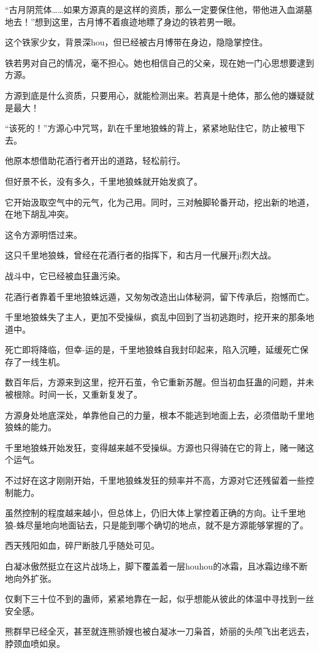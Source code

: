 \begin{this_body}
“古月阴荒体……如果方源真的是这样的资质，那么一定要保住他，带他进入血湖墓地去！”想到这里，古月博不着痕迹地瞟了身边的铁若男一眼。

这个铁家少女，背景深hou，但已经被古月博带在身边，隐隐掌控住。

铁若男对自己的情况，毫不担心。她也相信自己的父亲，现在她一门心思想要逮到方源。

方源到底是什么资质，只要用心，就能检测出来。若真是十绝体，那么他的嫌疑就是最大！

“该死的！”方源心中咒骂，趴在千里地狼蛛的背上，紧紧地贴住它，防止被甩下去。

他原本想借助花酒行者开出的道路，轻松前行。

但好景不长，没有多久，千里地狼蛛就开始发疯了。

它开始汲取空气中的元气，化为己用。同时，三对触脚轮番开动，挖出新的地道，在地下胡乱冲突。

这令方源明悟过来。

这只千里地狼蛛，曾经在花酒行者的指挥下，和古月一代展开ji烈大战。

战斗中，它已经被血狂蛊污染。

花酒行者靠着千里地狼蛛远遁，又匆匆改造出山体秘洞，留下传承后，抱憾而亡。

千里地狼蛛失了主人，更加不受操纵，疯乱中回到了当初逃跑时，挖开来的那条地道中。

死亡即将降临，但幸-运的是，千里地狼蛛自我封印起来，陷入沉睡，延缓死亡保存了一线生机。

数百年后，方源来到这里，挖开石茧，令它重新苏醒。但当初血狂蛊的问题，并未被根除。时间一长，又重新复发了。

方源身处地底深处，单靠他自己的力量，根本不能逃到地面上去，必须借助千里地狼蛛的能力。

千里地狼蛛开始发狂，变得越来越不受操纵。方源也只得骑在它的背上，赌一赌这个运气。

不过好在这才刚刚开始，千里地狼蛛发狂的频率并不高，方源对它还残留着一些控制能力。

虽然控制的程度越来越小，但总体上，仍旧大体上掌控着正确的方向。让千里地狼-蛛尽量地向地面钻去，只是能到哪个确切的地点，就不是方源能够掌握的了。

西天残阳如血，碎尸断肢几乎随处可见。

白凝冰傲然挺立在这片战场上，脚下覆盖着一层houhou的冰霜，且冰霜边缘不断地向外扩张。

仅剩下三十位不到的蛊师，紧紧地靠在一起，似乎想能从彼此的体温中寻找到一丝安全感。

熊群早已经全灭，甚至就连熊骄嫂也被白凝冰一刀枭首，娇丽的头颅飞出老远去，脖颈血喷如泉。


\end{this_body}
